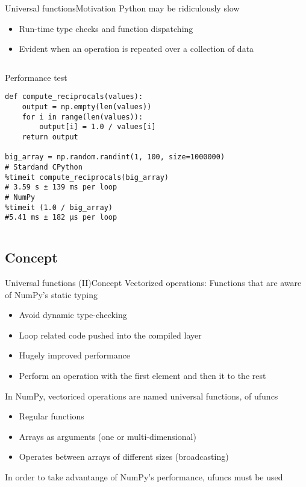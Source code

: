 \documentclass[10pt,compress]{beamer} %
\begin{document}
\begin{frame}[fragile]{Universal functions}{Motivation}
	Python may be ridiculously slow
	\begin{itemize}
		\item Run-time type checks and function dispatching
		\item Evident when an operation is repeated over a collection of data
	\end{itemize}

	\vspace{-0.2cm} 
	\begin{columns}
		\begin{exampleblock}{\footnotesize{Performance test}}
		\vspace{-0.2cm} 
			\begin{lstlisting}
def compute_reciprocals(values):
    output = np.empty(len(values))
    for i in range(len(values)):
        output[i] = 1.0 / values[i]
    return output

big_array = np.random.randint(1, 100, size=1000000)
# Stardand CPython
%timeit compute_reciprocals(big_array)
# 3.59 s ± 139 ms per loop 
# NumPy
%timeit (1.0 / big_array)
#5.41 ms ± 182 µs per loop
			\end{lstlisting}
		\vspace{-0.2cm} 
		\end{exampleblock}
	\end{columns}
\end{frame}

\subsection{Concept}

\begin{frame}{Universal functions (II)}{Concept}
	Vectorized operations: Functions that are aware of NumPy's static typing
	\begin{itemize}
		\item Avoid dynamic type-checking
		\item Loop related code pushed into the compiled layer
		\item Hugely improved performance
		\item Perform an operation with the first element and then it to the rest
	\end{itemize}
	In NumPy, vectoriced operations are named \alert{universal functions}, of \alert{ufuncs}
	\begin{itemize}
		\item Regular functions
		\item Arrays as arguments (one or multi-dimensional)
		\item Operates between arrays of different sizes (\alert{broadcasting})
	\end{itemize}
	In order to take advantange of NumPy's performance, ufuncs must be used
\end{frame}
\end{document}
